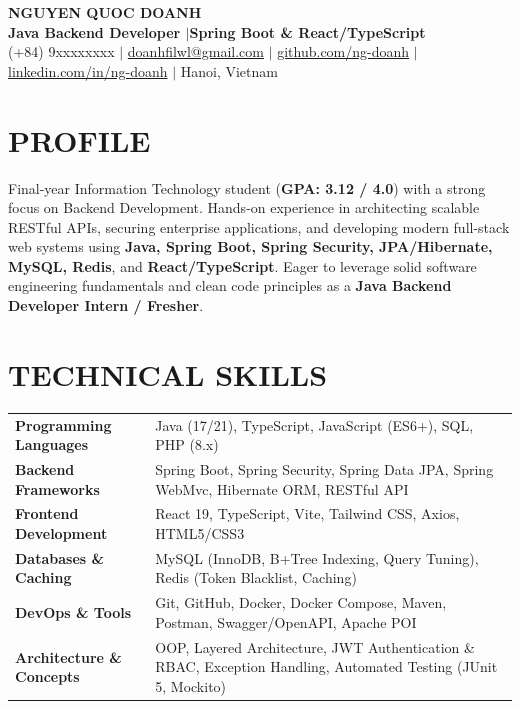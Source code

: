 ﻿\documentclass[10pt,a4paper]{article}
\begin{document}
\begin{center}
    {\LARGE \textbf{\color{primary} NGUYEN QUOC DOANH}} \\[3pt]
    {\normalsize \textbf{Java Backend Developer \enspace$\vert$\enspace Spring Boot \& React/TypeScript}} \\[3pt]
    \small
    (+84) 9xxxxxxxx \enspace$\vert$\enspace 
    \href{mailto:doanhfilwl@gmail.com}{doanhfilwl@gmail.com} \enspace$\vert$\enspace 
    \href{https://github.com/ng-doanh}{github.com/ng-doanh} \enspace$\vert$\enspace 
    \href{https://linkedin.com/in/ng-doanh}{linkedin.com/in/ng-doanh} \enspace$\vert$\enspace 
    Hanoi, Vietnam
\end{center}

\vspace{-6pt}

\section*{PROFILE}
Final-year Information Technology student (\textbf{GPA: 3.12 / 4.0}) with a strong focus on Backend Development. Hands-on experience in architecting scalable RESTful APIs, securing enterprise applications, and developing modern full-stack web systems using \textbf{Java, Spring Boot, Spring Security, JPA/Hibernate, MySQL, Redis}, and \textbf{React/TypeScript}. Eager to leverage solid software engineering fundamentals and clean code principles as a \textbf{Java Backend Developer Intern / Fresher}.

\section*{TECHNICAL SKILLS}
\begin{tabularx}{\textwidth}{@{}l X@{}}
\textbf{Programming Languages} & Java (17/21), TypeScript, JavaScript (ES6+), SQL, PHP (8.x) \\
\textbf{Backend Frameworks}   & Spring Boot, Spring Security, Spring Data JPA, Spring WebMvc, Hibernate ORM, RESTful API \\
\textbf{Frontend Development}  & React 19, TypeScript, Vite, Tailwind CSS, Axios, HTML5/CSS3 \\
\textbf{Databases \& Caching}  & MySQL (InnoDB, B+Tree Indexing, Query Tuning), Redis (Token Blacklist, Caching) \\
\textbf{DevOps \& Tools}       & Git, GitHub, Docker, Docker Compose, Maven, Postman, Swagger/OpenAPI, Apache POI \\
\textbf{Architecture \& Concepts} & OOP, Layered Architecture, JWT Authentication \& RBAC, Exception Handling, Automated Testing (JUnit 5, Mockito) \\
\end{tabularx}
\end{document}
